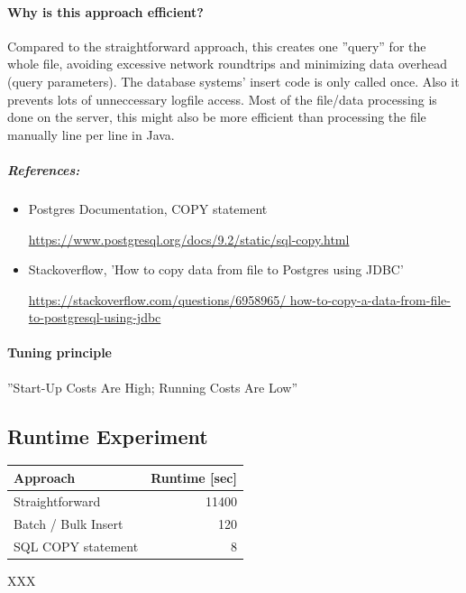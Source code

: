 \documentclass[11pt]{scrartcl}
\begin{document}
  \paragraph{Why is this approach efficient?}

  Compared to the straightforward approach, this creates one ''query''
  for the whole file, avoiding excessive network roundtrips and minimizing
  data overhead (query parameters). The database systems' insert code
  is only called once. Also it prevents lots of unneccessary
  logfile access. Most of the file/data processing
  is done on the server, this might also be more efficient than
  processing the file manually line per line in Java.
  
  
  \subparagraph{References:}
  
  \begin{itemize}
  
  \item{Postgres Documentation, COPY statement}
  
  \url{https://www.postgresql.org/docs/9.2/static/sql-copy.html}
  
  \item{Stackoverflow, 'How to copy data from file to Postgres using JDBC'}
  
  \url{https://stackoverflow.com/questions/6958965/
  how-to-copy-a-data-from-file-to-postgresql-using-jdbc}
  
  \end{itemize}

  \paragraph{Tuning principle}
  
  ''Start-Up Costs Are High; Running Costs Are Low''

  \subsection*{Runtime Experiment}

  \begin{table}[H]
  \begin{tabular}{l|r}
    Approach & Runtime [sec] \\
    \hline
    Straightforward & 11400 \\
    Batch / Bulk Insert & 120 \\
    SQL COPY statement & 8   
  \end{tabular}
  \end{table}XXX
\end{document}
